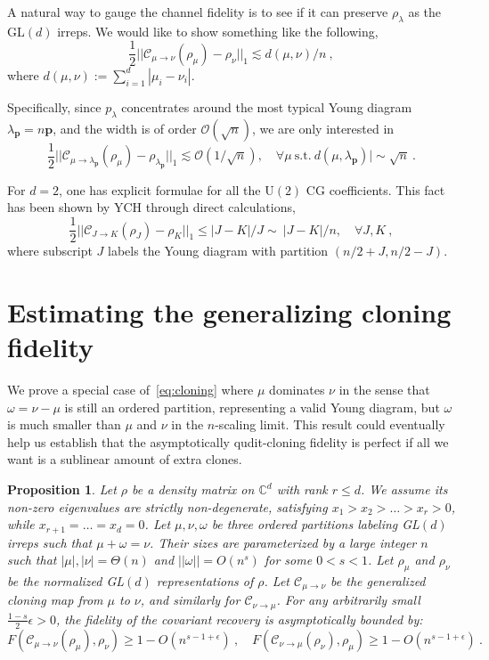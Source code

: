\documentclass[11pt,letterpaper]{article}
\newtheorem{prop}{Proposition}
\def\O{\mathcal{O}}
\def\C{\mathcal{C}}
\begin{document}
A natural way to gauge the channel fidelity is to see if it can preserve $\rho_\lambda$ as the GL$(d)$ irreps. We would like to show something like the following,
\begin{equation}\label{eq:cloning}
    \frac12||\C_{\mu\to \nu}(\rho_\mu) - \rho_\nu||_1\lesssim d(\mu,\nu)/n\ ,
\end{equation}
where $d(\mu,\nu):=\sum_{i=1}^d |\mu_i-\nu_i|$.

Specifically, since $p_\lambda$ concentrates around the most typical Young diagram $\lambda_{\mathbf{p}}=n\mathbf{p}$, and the width is of order $\O(\sqrt{n})$, we are only interested in
\begin{equation}\label{eq:error1}
    \frac12||\C_{\mu\to \lambda_{\mathbf{p}}}(\rho_\mu) - \rho_{\lambda_{\mathbf{p}}}||_1\lesssim \O(1/\sqrt{n}), \quad\forall\mu \ \mathrm{s.t.}\ d(\mu,\lambda_{\mathbf{p}})|\sim\sqrt{n}\ .
\end{equation}

For $d=2$, one has explicit formulae for all the U$(2)$ CG coefficients. This fact has been shown by YCH through direct calculations,
\begin{equation}
    \frac12||\C_{J\to K}(\rho_J) - \rho_K||_1\le |J-K|/J\sim\ |J-K|/n,\quad \forall J, K\ ,
\end{equation}
where subscript $J$ labels the Young diagram with partition $(n/2+J,n/2-J)$. 




\section{Estimating the generalizing cloning fidelity}
We prove a special case of~\eqref{eq:cloning} where $\mu$ dominates $\nu$ in the sense that $\omega=\nu-\mu$ is still an ordered partition, representing a valid Young diagram, but $\omega$ is much smaller than $\mu$ and $\nu$ in the $n$-scaling limit. This result could eventually help us establish that the asymptotically qudit-cloning fidelity is perfect if all we want is a sublinear amount of extra clones.

\begin{prop}\label{prop:main}
    Let $\rho$ be a density matrix on $\mathbb{C}^d$ with rank $r \le d$. We assume its non-zero eigenvalues are strictly non-degenerate, satisfying $x_1 > x_2 > \dots > x_r > 0$, while $x_{r+1} = \dots = x_d = 0$. Let $\mu,\nu,\omega$ be three ordered partitions labeling GL$(d)$ irreps such that $\mu+\omega=\nu$. Their sizes are parameterized by a large integer $n$ such that $|\mu|,|\nu|=\Theta(n)$ and $||\omega||=O(n^s)$ for some $0<s<1$. Let $\rho_{\mu}$ and $\rho_\nu$ be the normalized GL$(d)$ representations of $\rho$. Let $\C_{\mu\to\nu}$ be the generalized cloning map from $\mu$ to $\nu$, and similarly for $\C_{\nu\to\mu}$. For any arbitrarily small $\frac{1-s}{2}\epsilon>0$, the fidelity of the covariant recovery is asymptotically bounded by:
    \begin{equation}
        F(\C_{\mu\to\nu}(\rho_\mu), \rho_\nu)\ge 1-O(n^{s-1+\epsilon})\ ,\quad F(\C_{\nu\to\mu}(\rho_\nu), \rho_\mu)\ge 1-O(n^{s-1+\epsilon})\ .
    \end{equation}
\end{prop}
\end{document}
